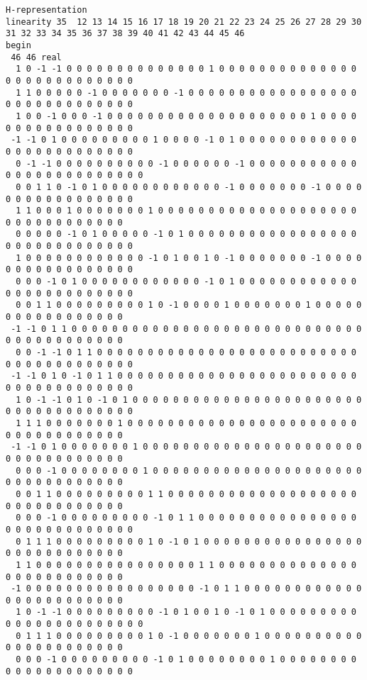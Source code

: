 \documentclass[%
  twocolumn,
 showpacs,
 showkeys,
 preprintnumbers,
 amsmath,amssymb,
 aps,
  pra,
  longbibliography,
 floatfix,
 ]{revtex4-1}
\begin{document}
{\begin{lstlisting}[backgroundcolor=\color{yellow!10},framerule=0pt,breaklines=true, frame=tb]
H-representation
linearity 35  12 13 14 15 16 17 18 19 20 21 22 23 24 25 26 27 28 29 30 31 32 33 34 35 36 37 38 39 40 41 42 43 44 45 46
begin
 46 46 real
  1 0 -1 -1 0 0 0 0 0 0 0 0 0 0 0 0 0 0 1 0 0 0 0 0 0 0 0 0 0 0 0 0 0 0 0 0 0 0 0 0 0 0 0 0 0 0
  1 1 0 0 0 0 0 -1 0 0 0 0 0 0 0 -1 0 0 0 0 0 0 0 0 0 0 0 0 0 0 0 0 0 0 0 0 0 0 0 0 0 0 0 0 0 0
  1 0 0 -1 0 0 0 -1 0 0 0 0 0 0 0 0 0 0 0 0 0 0 0 0 0 0 0 0 1 0 0 0 0 0 0 0 0 0 0 0 0 0 0 0 0 0
 -1 -1 0 1 0 0 0 0 0 0 0 0 0 1 0 0 0 0 -1 0 1 0 0 0 0 0 0 0 0 0 0 0 0 0 0 0 0 0 0 0 0 0 0 0 0 0
  0 -1 -1 0 0 0 0 0 0 0 0 0 0 -1 0 0 0 0 0 0 -1 0 0 0 0 0 0 0 0 0 0 0 0 0 0 0 0 0 0 0 0 0 0 0 0 0
  0 0 1 1 0 -1 0 1 0 0 0 0 0 0 0 0 0 0 0 0 -1 0 0 0 0 0 0 0 -1 0 0 0 0 0 0 0 0 0 0 0 0 0 0 0 0 0
  1 1 0 0 0 1 0 0 0 0 0 0 0 1 0 0 0 0 0 0 0 0 0 0 0 0 0 0 0 0 0 0 0 0 0 0 0 0 0 0 0 0 0 0 0 0
  0 0 0 0 0 -1 0 1 0 0 0 0 0 -1 0 1 0 0 0 0 0 0 0 0 0 0 0 0 0 0 0 0 0 0 0 0 0 0 0 0 0 0 0 0 0 0
  1 0 0 0 0 0 0 0 0 0 0 0 0 -1 0 1 0 0 1 0 -1 0 0 0 0 0 0 0 -1 0 0 0 0 0 0 0 0 0 0 0 0 0 0 0 0 0
  0 0 0 -1 0 1 0 0 0 0 0 0 0 0 0 0 0 0 -1 0 1 0 0 0 0 0 0 0 0 0 0 0 0 0 0 0 0 0 0 0 0 0 0 0 0 0
  0 0 1 1 0 0 0 0 0 0 0 0 0 1 0 -1 0 0 0 0 1 0 0 0 0 0 0 0 1 0 0 0 0 0 0 0 0 0 0 0 0 0 0 0 0 0
 -1 -1 0 1 1 0 0 0 0 0 0 0 0 0 0 0 0 0 0 0 0 0 0 0 0 0 0 0 0 0 0 0 0 0 0 0 0 0 0 0 0 0 0 0 0 0
  0 0 -1 -1 0 1 1 0 0 0 0 0 0 0 0 0 0 0 0 0 0 0 0 0 0 0 0 0 0 0 0 0 0 0 0 0 0 0 0 0 0 0 0 0 0 0
 -1 -1 0 1 0 -1 0 1 1 0 0 0 0 0 0 0 0 0 0 0 0 0 0 0 0 0 0 0 0 0 0 0 0 0 0 0 0 0 0 0 0 0 0 0 0 0
  1 0 -1 -1 0 1 0 -1 0 1 0 0 0 0 0 0 0 0 0 0 0 0 0 0 0 0 0 0 0 0 0 0 0 0 0 0 0 0 0 0 0 0 0 0 0 0
  1 1 1 0 0 0 0 0 0 0 1 0 0 0 0 0 0 0 0 0 0 0 0 0 0 0 0 0 0 0 0 0 0 0 0 0 0 0 0 0 0 0 0 0 0 0
 -1 -1 0 1 0 0 0 0 0 0 0 1 0 0 0 0 0 0 0 0 0 0 0 0 0 0 0 0 0 0 0 0 0 0 0 0 0 0 0 0 0 0 0 0 0 0
  0 0 0 -1 0 0 0 0 0 0 0 0 1 0 0 0 0 0 0 0 0 0 0 0 0 0 0 0 0 0 0 0 0 0 0 0 0 0 0 0 0 0 0 0 0 0
  0 0 1 1 0 0 0 0 0 0 0 0 0 1 1 0 0 0 0 0 0 0 0 0 0 0 0 0 0 0 0 0 0 0 0 0 0 0 0 0 0 0 0 0 0 0
  0 0 0 -1 0 0 0 0 0 0 0 0 0 -1 0 1 1 0 0 0 0 0 0 0 0 0 0 0 0 0 0 0 0 0 0 0 0 0 0 0 0 0 0 0 0 0
  0 1 1 1 0 0 0 0 0 0 0 0 0 1 0 -1 0 1 0 0 0 0 0 0 0 0 0 0 0 0 0 0 0 0 0 0 0 0 0 0 0 0 0 0 0 0
  1 1 0 0 0 0 0 0 0 0 0 0 0 0 0 0 0 0 1 1 0 0 0 0 0 0 0 0 0 0 0 0 0 0 0 0 0 0 0 0 0 0 0 0 0 0
 -1 0 0 0 0 0 0 0 0 0 0 0 0 0 0 0 0 0 -1 0 1 1 0 0 0 0 0 0 0 0 0 0 0 0 0 0 0 0 0 0 0 0 0 0 0 0
  1 0 -1 -1 0 0 0 0 0 0 0 0 0 -1 0 1 0 0 1 0 -1 0 1 0 0 0 0 0 0 0 0 0 0 0 0 0 0 0 0 0 0 0 0 0 0 0
  0 1 1 1 0 0 0 0 0 0 0 0 0 1 0 -1 0 0 0 0 0 0 0 1 0 0 0 0 0 0 0 0 0 0 0 0 0 0 0 0 0 0 0 0 0 0
  0 0 0 -1 0 0 0 0 0 0 0 0 0 -1 0 1 0 0 0 0 0 0 0 0 1 0 0 0 0 0 0 0 0 0 0 0 0 0 0 0 0 0 0 0 0 0

\end{lstlisting}}
\end{document}
